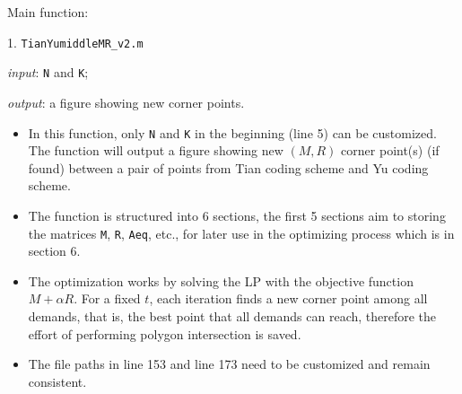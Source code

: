 \documentclass[11pt,letterpaper]{article}
\begin{document}
Main function:

1. \texttt{TianYumiddleMR\_v2.m}

\textit{input}: \texttt{N} and \texttt{K};

\textit{output}: a figure showing new corner points.

\begin{itemize}
\item In this function, only \texttt{N} and \texttt{K} in the beginning (line 5) can be customized. The function will output a figure showing new $(M,R)$ corner point(s) (if found) between a pair of points from Tian coding scheme and Yu coding scheme.

\item The function is structured into 6 sections, the first 5 sections aim to storing the matrices \texttt{M}, \texttt{R}, \texttt{Aeq}, etc., for later use in the optimizing process which is in section 6. 

\item The optimization works by solving the LP with the objective function $M+\alpha R$. For a fixed $t$, each iteration finds a new corner point among all demands, that is, the best point that all demands can reach, therefore the effort of performing polygon intersection is saved.

\item The file paths in line 153 and line 173 need to be customized and remain consistent. 
\end{itemize}
\end{document}
